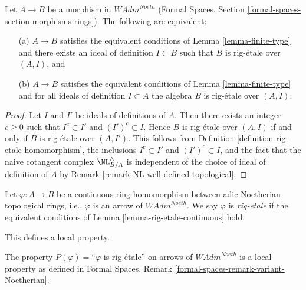 \begin{lemma}
\label{lemma-rig-etale-continuous}
Let $A \to B$ be a morphism in $\textit{WAdm}^{Noeth}$
(Formal Spaces, Section \ref{formal-spaces-section-morphisms-rings}).
The following are equivalent:
\begin{enumerate}
\item[(a)] $A \to B$ satisfies the equivalent conditions of
Lemma \ref{lemma-finite-type} and there exists an ideal of definition
$I \subset B$ such that $B$ is rig-\'etale over $(A, I)$, and
\item[(b)] $A \to B$ satisfies the equivalent conditions of
Lemma \ref{lemma-finite-type} and for all ideals of definition
$I \subset A$ the algebra $B$ is rig-\'etale over $(A, I)$.
\end{enumerate}
\end{lemma}

\begin{proof}
Let $I$ and $I'$ be ideals of definitions of $A$. Then there exists an
integer $c \geq 0$ such that $I^c \subset I'$ and $(I')^c \subset I$. Hence
$B$ is rig-\'etale over $(A, I)$ if and only if
$B$ is rig-\'etale over $(A, I')$. This follows from
Definition \ref{definition-rig-etale-homomorphism},
the inclusions $I^c \subset I'$ and $(I')^c \subset I$, and
the fact that the naive cotangent complex $\NL_{B/A}^\wedge$
is independent of the choice of ideal of definition of $A$ by
Remark \ref{remark-NL-well-defined-topological}.
\end{proof}

\begin{definition}
\label{definition-rig-etale-continuous-homomorphism}
Let $\varphi : A \to B$ be a continuous ring homomorphism
between adic Noetherian topological rings, i.e., $\varphi$
is an arrow of $\textit{WAdm}^{Noeth}$. We say
$\varphi$ is {\it rig-etale} if the equivalent conditions
of Lemma \ref{lemma-rig-etale-continuous} hold.
\end{definition}

\noindent
This defines a local property.

\begin{lemma}
\label{lemma-rig-etale-axioms}
The property $P(\varphi)=$``$\varphi$ is rig-\'etale'' on arrows
of $\textit{WAdm}^{Noeth}$ is a local property as defined in
Formal Spaces, Remark \ref{formal-spaces-remark-variant-Noetherian}.
\end{lemma}

